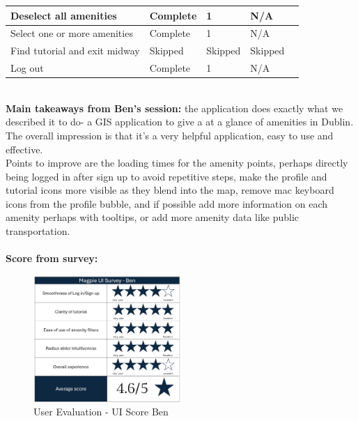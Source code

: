 \begin{table}[h!]
\begin{tabular}{|p{}|p{}|p{}|p{}|p{}|}
        \hline
        Deselect all amenities        & Complete        & 1                   & N/A             \\
        \hline
        Select one or more amenities  & Complete        & 1                   & N/A             \\
        \hline
        Find tutorial and exit midway & Skipped         & Skipped             & Skipped         \\
        \hline
        Log out                       & Complete        & 1                   & N/A             \\
        \hline
    \end{tabular}
\end{table}\\
\noindent\textbf{Main takeaways from Ben's session: }the application does exactly what we described it to do- a GIS application to give a at a glance of amenities in Dublin. The overall impression is that it's a very helpful application, easy to use and effective.\\
Points to improve are the loading times for the amenity points, perhaps  directly being logged in after sign up to avoid repetitive steps, make the profile and tutorial icons more visible as they blend into the map, remove mac keyboard icons from the profile bubble, and if possible add more information on each amenity perhaps with tooltips, or add more amenity data like public transportation.\\ \\
\textbf{Score from survey: }
\begin{figure}[h!]
    \centering
    \includegraphics[width=0.5\textwidth]{images/survey-ben.png}
    \caption{User Evaluation - UI Score Ben}
\end{figure}

\newpage
